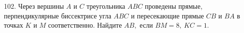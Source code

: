 102. Через вершины $A$ и $C$ треугольника $ABC$ проведены прямые, перпендикулярные биссектрисе угла $ABC$ и пересекающие прямые $CB$ и $BA$ в точках $K$ и $M$ соответственно. Найдите $AB,$ если $BM=8,\ KC=1.$\\
